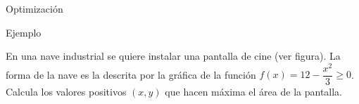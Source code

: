 \documentclass[8pt]{beamer}
\begin{document}
\begin{frame}[t]{Optimización}
\begin{exampleblock}{Ejemplo}


En una nave industrial se quiere instalar una pantalla de cine (ver figura). La forma de la nave es la descrita por la gráfica de la función $f(x) = 12 - \dfrac{x^2}{3} \geq 0$. Calcula los valores positivos $(x,y)$ que hacen máxima el área de la pantalla.
\begin{center}
\end{center}
\end{exampleblock}
\end{frame}
\end{document}
